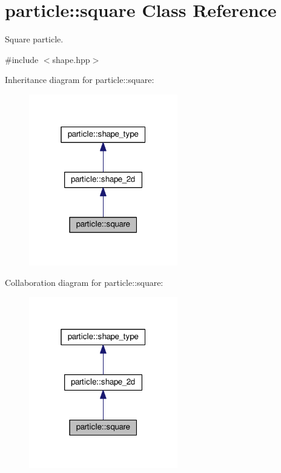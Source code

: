 \hypertarget{classparticle_1_1square}{}\section{particle\+:\+:square Class Reference}
\label{classparticle_1_1square}


Square particle.  




{\ttfamily \#include $<$shape.\+hpp$>$}



Inheritance diagram for particle\+:\+:square\+:
\nopagebreak
\begin{figure}[H]
\begin{center}
\leavevmode
\includegraphics[width=184pt]{d0/d9d/classparticle_1_1square__inherit__graph}
\end{center}
\end{figure}


Collaboration diagram for particle\+:\+:square\+:
\nopagebreak
\begin{figure}[H]
\begin{center}
\leavevmode
\includegraphics[width=184pt]{de/dc7/classparticle_1_1square__coll__graph}
\end{center}
\end{figure}
